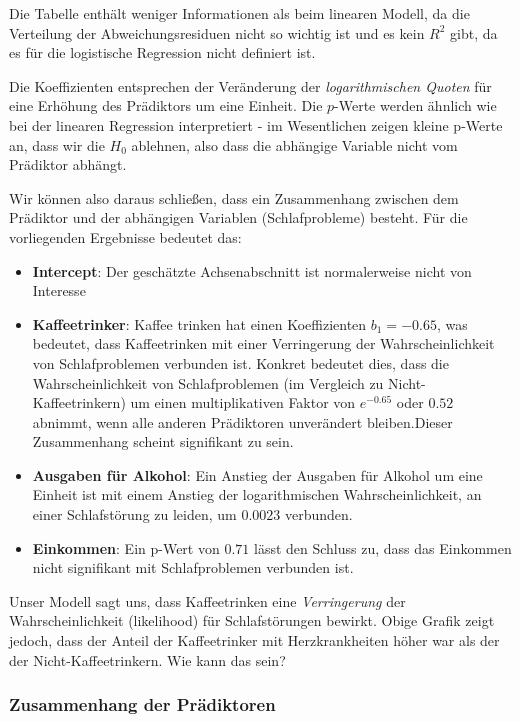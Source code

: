 \documentclass[
]{article}
\begin{document}
Die Tabelle enthält weniger Informationen als beim linearen Modell, da die Verteilung der Abweichungsresiduen nicht so wichtig ist und es kein \(R^2\) gibt, da es für die logistische Regression nicht definiert ist.

Die Koeffizienten entsprechen der Veränderung der \emph{logarithmischen Quoten} für eine Erhöhung des Prädiktors um eine Einheit. Die \(p\)-Werte werden ähnlich wie bei der linearen Regression interpretiert - im Wesentlichen zeigen kleine p-Werte an, dass wir die \(H_0\) ablehnen, also dass die abhängige Variable nicht vom Prädiktor abhängt.

Wir können also daraus schließen, dass ein Zusammenhang zwischen dem Prädiktor und der abhängigen Variablen (Schlafprobleme) besteht. Für die vorliegenden Ergebnisse bedeutet das:

\begin{itemize}
\item
  \textbf{Intercept}: Der geschätzte Achsenabschnitt ist normalerweise nicht von Interesse
\item
  \textbf{Kaffeetrinker}: Kaffee trinken hat einen Koeffizienten \(b_1 = -0.65\), was bedeutet, dass Kaffeetrinken mit einer Verringerung der Wahrscheinlichkeit von Schlafproblemen verbunden ist. Konkret bedeutet dies, dass die Wahrscheinlichkeit von Schlafproblemen (im Vergleich zu Nicht-Kaffeetrinkern) um einen multiplikativen Faktor von \(e^{-0.65}\) oder \(0.52\) abnimmt, wenn alle anderen Prädiktoren unverändert bleiben.Dieser Zusammenhang scheint signifikant zu sein.
\item
  \textbf{Ausgaben für Alkohol}: Ein Anstieg der Ausgaben für Alkohol um eine Einheit ist mit einem Anstieg der logarithmischen Wahrscheinlichkeit, an einer Schlafstörung zu leiden, um \(0.0023\) verbunden.
\item
  \textbf{Einkommen}: Ein p-Wert von \(0.71\) lässt den Schluss zu, dass das Einkommen nicht signifikant mit Schlafproblemen verbunden ist.
\end{itemize}

Unser Modell sagt uns, dass Kaffeetrinken eine \emph{Verringerung} der Wahrscheinlichkeit (likelihood) für Schlafstörungen bewirkt. Obige Grafik zeigt jedoch, dass der Anteil der Kaffeetrinker mit Herzkrankheiten höher war als der der Nicht-Kaffeetrinkern. Wie kann das sein?

\subsubsection{Zusammenhang der Prädiktoren}\label{zusammenhang-der-pruxe4diktoren}
\end{document}
